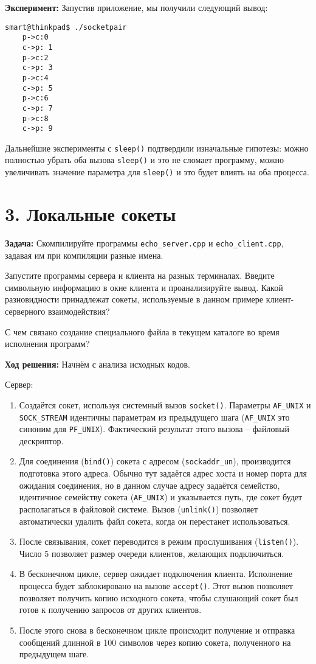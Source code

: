 \textbf{Эксперимент:} Запустив приложение, мы получили следующий вывод:
\begin{Verbatim}[frame=single]
    smart@thinkpad$ ./socketpair
    p->c:0
    c->p: 1
    p->c:2
    c->p: 3
    p->c:4
    c->p: 5
    p->c:6
    c->p: 7
    p->c:8
    c->p: 9
\end{Verbatim}

Дальнейшие эксперименты с \texttt{sleep()} подтвердили изначальные гипотезы: можно полностью убрать оба вызова \texttt{sleep()} и это не сломает программу, можно увеличивать значение параметра для \texttt{sleep()} и это будет влиять на оба процесса.

\section*{3. Локальные сокеты}
\textbf{Задача:} Скомпилируйте программы \texttt{echo\_server.cpp} и \texttt{echo\_client.cpp}, задавая им при компиляции разные имена.

Запустите программы сервера и клиента на разных терминалах. Введите символьную информацию в окне клиента и проанализируйте вывод. Какой разновидности принадлежат сокеты, используемые в данном примере клиент-серверного взаимодействия?

С чем связано создание специального файла в текущем каталоге во время исполнения программ?

\textbf{Ход решения:} Начнём с анализа исходных кодов.

Сервер:
\begin{enumerate}
\item Создаётся сокет, используя системный вызов \texttt{socket()}. Параметры \texttt{AF\_UNIX} и \texttt{SOCK\_STREAM} идентичны параметрам из предыдущего шага (\texttt{AF\_UNIX} это синоним для \texttt{PF\_UNIX}). Фактический результат этого вызова -- файловый дескриптор.
\item Для соединения (\texttt{bind()}) сокета с адресом (\texttt{sockaddr\_un}), производится подготовка этого адреса. Обычно тут задаётся адрес хоста и номер порта для ожидания соединения, но в данном случае адресу задаётся семейство, идентичное семейству сокета (\texttt{AF\_UNIX}) и указывается путь, где сокет будет располагаться в файловой системе. Вызов (\texttt{unlink()}) позволяет автоматически удалить файл сокета, когда он перестанет использоваться.
\item После связывания, сокет переводится в режим прослушивания (\texttt{listen()}). Число 5 позволяет размер очереди клиентов, желающих подключиться.
\item В бесконечном цикле, сервер ожидает подключения клиента. Исполнение процесса будет заблокировано на вызове \texttt{accept()}. Этот вызов позволяет позволяет получить копию исходного сокета, чтобы слушающий сокет был готов к получению запросов от других клиентов.
\item После этого снова в бесконечном цикле происходит получение и отправка сообщений длинной в 100 символов через копию сокета, полученного на предыдущем шаге.
\end{enumerate}

